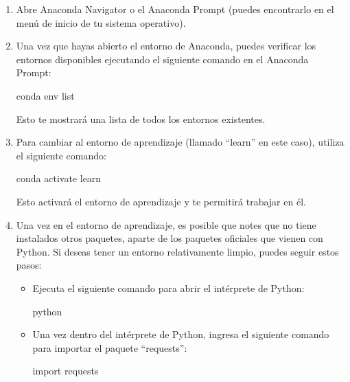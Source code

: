 \documentclass[
  jou,
  floatsintext,
  longtable,
  a4paper,
  nolmodern,
  notxfonts,
  notimes,
  colorlinks=true,linkcolor=blue,citecolor=blue,urlcolor=blue]{apa7}
\newenvironment{Shaded}{\begin{snugshade}}{\end{snugshade}}
\newcommand{\ExtensionTok}[1]{\textcolor[rgb]{0.00,0.23,0.31}{#1}}
\newcommand{\ImportTok}[1]{\textcolor[rgb]{0.00,0.46,0.62}{#1}}
\newcommand{\NormalTok}[1]{\textcolor[rgb]{0.00,0.23,0.31}{#1}}
\begin{document}
\begin{enumerate}
\def\labelenumi{\arabic{enumi}.}
\item
  Abre Anaconda Navigator o el Anaconda Prompt (puedes encontrarlo en el
  menú de inicio de tu sistema operativo).
\item
  Una vez que hayas abierto el entorno de Anaconda, puedes verificar los
  entornos disponibles ejecutando el siguiente comando en el Anaconda
  Prompt:

\begin{Shaded}
\begin{Highlighting}[]
\ExtensionTok{conda}\NormalTok{ env list}
\end{Highlighting}
\end{Shaded}

  Esto te mostrará una lista de todos los entornos existentes.
\item
  Para cambiar al entorno de aprendizaje (llamado ``learn'' en este
  caso), utiliza el siguiente comando:

\begin{Shaded}
\begin{Highlighting}[]
\ExtensionTok{conda}\NormalTok{ activate learn}
\end{Highlighting}
\end{Shaded}

  Esto activará el entorno de aprendizaje y te permitirá trabajar en él.
\item
  Una vez en el entorno de aprendizaje, es posible que notes que no
  tiene instalados otros paquetes, aparte de los paquetes oficiales que
  vienen con Python. Si deseas tener un entorno relativamente limpio,
  puedes seguir estos pasos:

  \begin{itemize}
  \item
    Ejecuta el siguiente comando para abrir el intérprete de Python:

\begin{Shaded}
\begin{Highlighting}[]
\ExtensionTok{python}
\end{Highlighting}
\end{Shaded}
  \item
    Una vez dentro del intérprete de Python, ingresa el siguiente
    comando para importar el paquete ``requests'':

\begin{Shaded}
\begin{Highlighting}[]
\ImportTok{import}\NormalTok{ requests}
\end{Highlighting}
\end{Shaded}


\end{itemize}
\end{enumerate}
\end{document}
